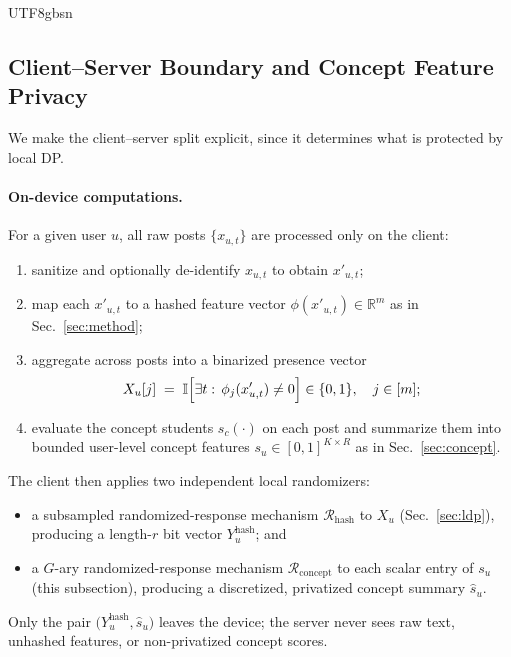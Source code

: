 \documentclass[lettersize,journal]{IEEEtran}
\begin{document}
\begin{CJK*}{UTF8}{gbsn}
\subsection{Client--Server Boundary and Concept Feature Privacy}
\label{sec:boundary}

We make the client--server split explicit, since it determines what is protected by local DP.

\paragraph{On-device computations.}
For a given user $u$, all raw posts $\{x_{u,t}\}$ are processed only on the client:
\begin{enumerate}[leftmargin=1.5em,itemsep=2pt]
  \item sanitize and optionally de-identify $x_{u,t}$ to obtain $x'_{u,t}$;
  \item map each $x'_{u,t}$ to a hashed feature vector $\phi(x'_{u,t}) \in \mathbb{R}^m$ as in Sec.~\ref{sec:method};
  \item aggregate across posts into a binarized presence vector
  \begin{equation}
    X_u[j] \;=\; \mathbb{I}\Bigl[\exists t:\,\phi_j(x'_{u,t}) \neq 0\Bigr] \in \{0,1\},
    \quad j \in [m];
  \end{equation}
  \item evaluate the concept students $s_c(\cdot)$ on each post and summarize them into bounded user-level concept features $s_u \in [0,1]^{K\times R}$ as in Sec.~\ref{sec:concept}.
\end{enumerate}

The client then applies two independent local randomizers:
\begin{itemize}[leftmargin=1.4em]
  \item a subsampled randomized-response mechanism $\mathcal{R}_{\text{hash}}$ to $X_u$ (Sec.~\ref{sec:ldp}), producing a length-$r$ bit vector $Y^{\text{hash}}_u$; and
  \item a $G$-ary randomized-response mechanism $\mathcal{R}_{\text{concept}}$ to each scalar entry of $s_u$ (this subsection), producing a discretized, privatized concept summary $\hat{s}_u$.
\end{itemize}
Only the pair $\bigl(Y^{\text{hash}}_u,\hat{s}_u\bigr)$ leaves the device; the server never sees raw text, unhashed features, or non-privatized concept scores.


\end{CJK*}
\end{document}

